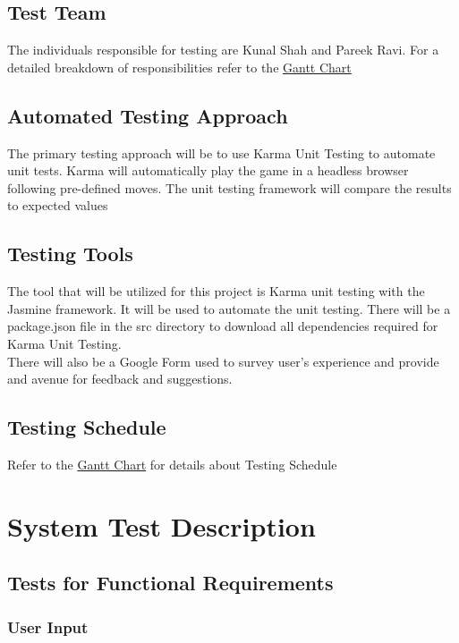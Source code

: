 \documentclass[12pt, titlepage]{article}
\begin{document}
\subsection{Test Team}
The individuals responsible for testing are Kunal Shah and Pareek Ravi. For a
detailed breakdown of responsibilities refer to the
\href{run:../../ProjectSchedule/Gantt Chart.gan}{Gantt Chart}

\subsection{Automated Testing Approach}
The primary testing approach will be to use Karma Unit Testing to automate unit
tests. Karma will automatically play the game in a headless browser following
pre-defined moves. The unit testing framework will compare the results to
expected values

\subsection{Testing Tools}
The tool that will be utilized for this project is Karma unit testing with the
Jasmine framework. It will be used to automate the unit testing. There will be a
package.json file in the src directory to download all dependencies required for
Karma Unit Testing.\\
There will also be a Google Form used to survey user's experience and provide
and avenue for feedback and suggestions.

\subsection{Testing Schedule}	
Refer to the \href{run:../../ProjectSchedule/Gantt Chart.gan}{Gantt Chart} for
details about Testing Schedule

\section{System Test Description}
	
\subsection{Tests for Functional Requirements}

\subsubsection{User Input}
		
\end{document}
